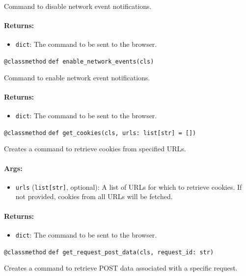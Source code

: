 \documentclass{article}
\begin{document}
\noindent Command to disable network event notifications.

\paragraph{Returns:}
\begin{itemize}
    \item \texttt{dict}: The command to be sent to the browser.
\end{itemize}

\noindent\texttt{@classmethod}
\noindent\texttt{def enable\_network\_events(cls)}

\noindent Command to enable network event notifications.

\paragraph{Returns:}
\begin{itemize}
    \item \texttt{dict}: The command to be sent to the browser.
\end{itemize}

\noindent\texttt{@classmethod}
\noindent\texttt{def get\_cookies(cls, urls: list[str] = [])}

\noindent Creates a command to retrieve cookies from specified URLs.

\paragraph{Args:}
\begin{itemize}
    \item \texttt{urls} (\texttt{list[str]}, optional): A list of URLs for which to retrieve cookies. If not provided, cookies from all URLs will be fetched.
\end{itemize}

\paragraph{Returns:}
\begin{itemize}
    \item \texttt{dict}: The command to be sent to the browser.
\end{itemize}

\noindent\texttt{@classmethod}
\noindent\texttt{def get\_request\_post\_data(cls, request\_id: str)}

\noindent Creates a command to retrieve POST data associated with a specific request.
\end{document}
